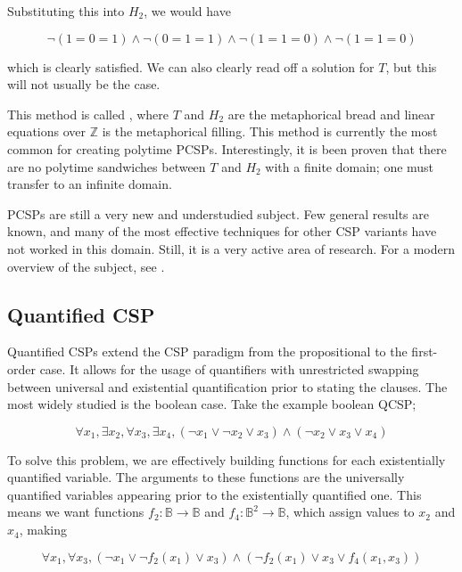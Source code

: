 Substituting this into $H_2$, we would have

\begin{equation}
    \neg (1 = 0 = 1) \wedge \neg (0 = 1 = 1) \wedge \neg (1 = 1 = 0) \wedge \neg (1 = 1 = 0)
\end{equation}

which is clearly satisfied. We can also clearly read off a solution for $T$, but this will not usually be the case.

This method is called , where $T$ and $H_2$ are the metaphorical bread and linear equations over $\mathbb{Z}$ is the metaphorical filling. This method is currently the most common for creating polytime PCSPs. Interestingly, it is been proven that there are no polytime sandwiches between $T$ and $H_2$ with a finite domain; one must transfer to an infinite domain.

PCSPs are still a very new and understudied subject. Few general results are known, and many of the most effective techniques for other CSP variants have not worked in this domain. Still, it is a very active area of research. For a modern overview of the subject, see \citep{krokhin2022invitation}.

\subsection{Quantified CSP}\label{sec:quantified}

Quantified CSPs extend the CSP paradigm from the propositional to the first-order case. It allows for the usage of quantifiers with unrestricted swapping between universal and existential quantification prior to stating the clauses. The most widely studied is the boolean case. Take the example boolean QCSP;

\begin{equation}
    \forall x_1, \exists x_2, \forall x_3, \exists x_4, (\neg x_1 \vee \neg x_2 \vee x_3) \wedge (\neg x_2 \vee x_3 \vee x_4)
\end{equation}

To solve this problem, we are effectively building functions for each existentially quantified variable. The arguments to these functions are the universally quantified variables appearing prior to the existentially quantified one. This means we want functions $f_2 : \mathbb{B} \rightarrow \mathbb{B}$ and $f_4 : \mathbb{B}^2 \rightarrow \mathbb{B}$, which assign values to $x_2$ and $x_4$, making

\begin{equation}
    \forall x_1, \forall x_3, (\neg x_1 \vee \neg f_2(x_1) \vee x_3) \wedge (\neg f_2(x_1) \vee x_3 \vee f_4(x_1, x_3))
\end{equation}

